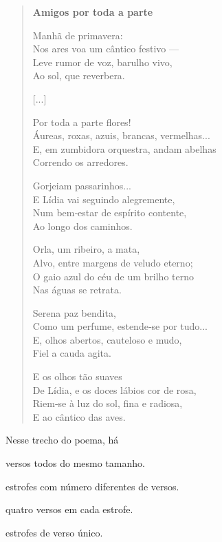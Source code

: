 \begin{verse}
\textbf{Amigos por toda a parte}

Manhã de primavera:\\
Nos ares voa um cântico festivo ---\\
Leve rumor de voz, barulho vivo,\\
Ao sol, que reverbera.

{[}...{]}

Por toda a parte flores!\\
Áureas, roxas, azuis, brancas, vermelhas...\\
E, em zumbidora orquestra, andam abelhas\\
Correndo os arredores.

Gorjeiam passarinhos...\\
E Lídia vai seguindo alegremente,\\
Num bem‑estar de espírito contente,\\
Ao longo dos caminhos.

Orla, um ribeiro, a mata,\\
Alvo, entre margens de veludo eterno;\\
O gaio azul do céu de um brilho terno\\
Nas águas se retrata.

Serena paz bendita,\\
Como um perfume, estende‑se por tudo...\\
E, olhos abertos, cauteloso e mudo,\\
Fiel a cauda agita.

E os olhos tão suaves\\
De Lídia, e os doces lábios cor de rosa,\\
Riem‑se à luz do sol, fina e radiosa,\\
E ao cântico das aves.
\end{verse}


Nesse trecho do poema, há

\begin{escolha}
\item versos todos do mesmo tamanho.

\item estrofes com número diferentes de versos.

\item quatro versos em cada estrofe.

\item estrofes de verso único.
\end{escolha}

